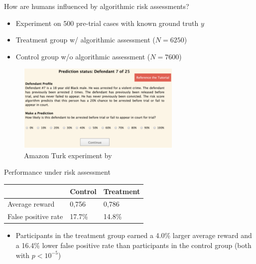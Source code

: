 \documentclass[11pt]{beamer}
\begin{document}
\begin{frame}{How are humans influenced by algorithmic risk assessments?}
\begin{itemize}
	\item Experiment on 500 pre-trial cases with known ground truth $y$
	\item Treatment group w/ algorithmic assessment ($N=6250$)
	\item Control group w/o algorithmic assessment ($N=7600$)
\end{itemize}
\begin{figure}[t!]
	\centering
	\footnotesize
	\includegraphics[width=0.7\textwidth]{Figures/experimentscreen.png}
	\caption{Amazon Turk experiment by \cite{green2019disparate}}
\end{figure}
\end{frame}

\begin{frame}{Performance under risk assessment}
\begin{table}[]
	\begin{tabular}{@{}lll}
		\toprule
		& \textbf{Control} & \textbf{Treatment} \\ \midrule
		Average reward      & 0,756            & 0,786               \\ \midrule
		False positive rate & 17.7\%           & 14.8\%              \\ \bottomrule
	\end{tabular}
\end{table}
\begin{itemize}
	\item Participants in the treatment group earned a 4.0\% larger average
	reward and a 16.4\% lower false positive rate than participants in the
	control group (both with $p < 10^{-5}$)
\end{itemize}
\end{frame}
\end{document}
